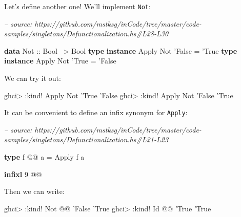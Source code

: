 \documentclass[]{article}
\newenvironment{Shaded}{}{}
\newcommand{\CommentTok}[1]{\textcolor[rgb]{0.38,0.63,0.69}{\textit{#1}}}
\newcommand{\DataTypeTok}[1]{\textcolor[rgb]{0.56,0.13,0.00}{#1}}
\newcommand{\DecValTok}[1]{\textcolor[rgb]{0.25,0.63,0.44}{#1}}
\newcommand{\FunctionTok}[1]{\textcolor[rgb]{0.02,0.16,0.49}{#1}}
\newcommand{\KeywordTok}[1]{\textcolor[rgb]{0.00,0.44,0.13}{\textbf{#1}}}
\newcommand{\NormalTok}[1]{#1}
\newcommand{\OtherTok}[1]{\textcolor[rgb]{0.00,0.44,0.13}{#1}}
\begin{document}
Let's define another one! We'll implement \texttt{Not}:

\begin{Shaded}
\begin{Highlighting}[]
\CommentTok{-- source: https://github.com/mstksg/inCode/tree/master/code-samples/singletons/Defunctionalization.hs#L28-L30}

\KeywordTok{data} \DataTypeTok{Not}\OtherTok{ ::} \DataTypeTok{Bool} \FunctionTok{~>} \DataTypeTok{Bool}
\KeywordTok{type} \KeywordTok{instance} \DataTypeTok{Apply} \DataTypeTok{Not}\NormalTok{ '}\DataTypeTok{False} \FunctionTok{=}\NormalTok{ '}\DataTypeTok{True}
\KeywordTok{type} \KeywordTok{instance} \DataTypeTok{Apply} \DataTypeTok{Not}\NormalTok{ '}\DataTypeTok{True}  \FunctionTok{=}\NormalTok{ '}\DataTypeTok{False}
\end{Highlighting}
\end{Shaded}

We can try it out:

\begin{Shaded}
\begin{Highlighting}[]
\NormalTok{ghci}\FunctionTok{>} \FunctionTok{:}\NormalTok{kind}\FunctionTok{!} \DataTypeTok{Apply} \DataTypeTok{Not}\NormalTok{ '}\DataTypeTok{True}
\NormalTok{'}\DataTypeTok{False}
\NormalTok{ghci}\FunctionTok{>} \FunctionTok{:}\NormalTok{kind}\FunctionTok{!} \DataTypeTok{Apply} \DataTypeTok{Not}\NormalTok{ '}\DataTypeTok{False}
\NormalTok{'}\DataTypeTok{True}
\end{Highlighting}
\end{Shaded}

It can be convenient to define an infix synonym for \texttt{Apply}:

\begin{Shaded}
\begin{Highlighting}[]
\CommentTok{-- source: https://github.com/mstksg/inCode/tree/master/code-samples/singletons/Defunctionalization.hs#L21-L23}

\KeywordTok{type}\NormalTok{ f }\FunctionTok{@@}\NormalTok{ a }\FunctionTok{=} \DataTypeTok{Apply}\NormalTok{ f a}

\KeywordTok{infixl} \DecValTok{9} \FunctionTok{@@}
\end{Highlighting}
\end{Shaded}

Then we can write:

\begin{Shaded}
\begin{Highlighting}[]
\NormalTok{ghci}\FunctionTok{>} \FunctionTok{:}\NormalTok{kind}\FunctionTok{!} \DataTypeTok{Not} \FunctionTok{@@}\NormalTok{ '}\DataTypeTok{False}
\NormalTok{'}\DataTypeTok{True}
\NormalTok{ghci}\FunctionTok{>} \FunctionTok{:}\NormalTok{kind}\FunctionTok{!} \DataTypeTok{Id} \FunctionTok{@@}\NormalTok{ '}\DataTypeTok{True}
\NormalTok{'}\DataTypeTok{True}
\end{Highlighting}
\end{Shaded}
\end{document}
